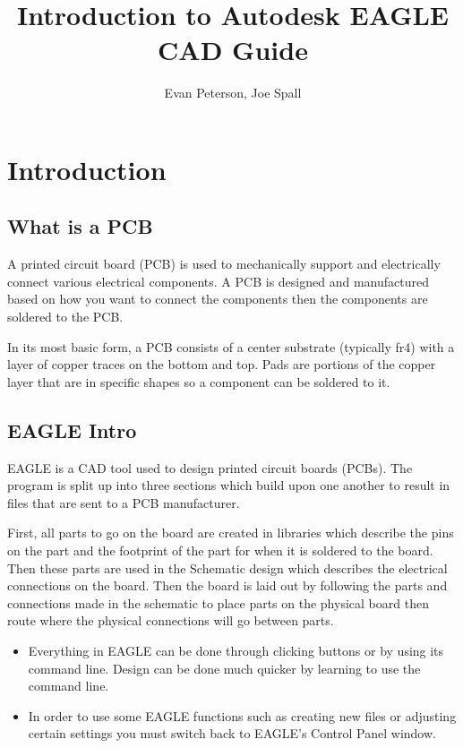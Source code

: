 \documentclass{article}
\title{Introduction to Autodesk EAGLE CAD Guide}
\author{Evan Peterson, Joe Spall}
\begin{document}
\maketitle{}
\setcounter{tocdepth}{2}
\tableofcontents
\pagebreak

\section{Introduction}

\subsection{What is a PCB}
A printed circuit board (PCB) is used to mechanically support and electrically connect various electrical components. A PCB is designed and manufactured based on how you want to connect the components then the components are soldered to the PCB. \par
In its most basic form, a PCB consists of a center substrate (typically fr4) with a layer of copper traces on the bottom and top. Pads are portions of the copper layer that are in specific shapes so a component can be soldered to it.

\subsection{EAGLE Intro}
EAGLE is a CAD tool used to design printed circuit boards (PCBs). The program is split up into three sections which build upon one another to result in files that are sent to a PCB manufacturer.\par
First, all parts to go on the board are created in libraries which describe the pins on the part and the footprint of the part for when it is soldered to the board. Then these parts are used in the Schematic design which describes the electrical connections on the board. Then the board is laid out by following the parts and connections made in the schematic to place parts on the physical board then route where the physical connections will go between parts.
\begin{tcolorbox} [title=Tips \& Tricks]
    \begin{itemize}
        \item Everything in EAGLE can be done through clicking buttons or by using its command line. Design can be done much quicker by learning to use the command line.
        \item In order to use some EAGLE functions such as creating new files or adjusting certain settings you must switch back to EAGLE's Control Panel window.
    \end{itemize}
\end{tcolorbox}
\end{document}
